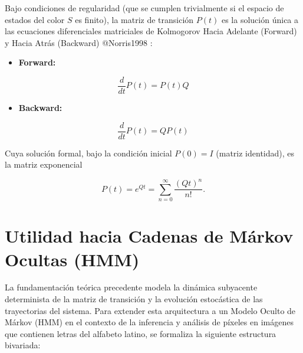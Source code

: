 \documentclass[
  spanish,
  us-letterpaper,
  DIV=11,
  numbers=noendperiod]{scrreprt}
\providecommand{\tightlist}{%
  \setlength{\itemsep}{0pt}\setlength{\parskip}{0pt}}
\newcounter{quartocalloutimpno}
\newcommand{\quartocalloutimp}[1]{\refstepcounter{quartocalloutimpno}\label{#1}}
\begin{document}
\begin{tcolorbox}[enhanced jigsaw, bottomtitle=1mm, opacityback=0, colback=white, colframe=quarto-callout-important-color-frame, leftrule=.75mm, rightrule=.15mm, breakable, colbacktitle=quarto-callout-important-color!10!white, toprule=.15mm, toptitle=1mm, arc=.35mm, title=\textcolor{quarto-callout-important-color}{\faExclamation}\hspace{0.5em}{Importante \ref*{imp-ecuaciones-dif-kolmogorov}: Propiedad (Ecuaciones Diferenciales de Kolmogorov)}, opacitybacktitle=0.6, titlerule=0mm, bottomrule=.15mm, coltitle=black, left=2mm]

\quartocalloutimp{imp-ecuaciones-dif-kolmogorov} 

Bajo condiciones de regularidad (que se cumplen trivialmente si el
espacio de estados del color \(S\) es finito), la matriz de transición
\(P(t)\) es la solución única a las ecuaciones diferenciales matriciales
de Kolmogorov Hacia Adelante (Forward) y Hacia Atrás (Backward)
@Norris1998 :

\begin{itemize}
\tightlist
\item
  \textbf{Forward:}
\end{itemize}

\[
\frac{d}{dt}P(t)=P(t)Q
\]

\begin{itemize}
\tightlist
\item
  \textbf{Backward:}
\end{itemize}

\[
\frac{d}{dt}P(t)=QP(t)
\]

Cuya solución formal, bajo la condición inicial \(P(0)=I\) (matriz
identidad), es la matriz exponencial

\[
P(t)
=
e^{Qt}
=
\sum_{n=0}^{\infty}
\frac{(Qt)^n}{n!}.
\]

\end{tcolorbox}

\section{Utilidad hacia Cadenas de Márkov Ocultas
(HMM)}\label{utilidad-hacia-cadenas-de-muxe1rkov-ocultas-hmm}

La fundamentación teórica precedente modela la dinámica subyacente
determinista de la matriz de transición y la evolución estocástica de
las trayectorias del sistema. Para extender esta arquitectura a un
Modelo Oculto de Márkov (HMM) en el contexto de la inferencia y análisis
de píxeles en imágenes que contienen letras del alfabeto latino, se
formaliza la siguiente estructura bivariada:
\end{document}
